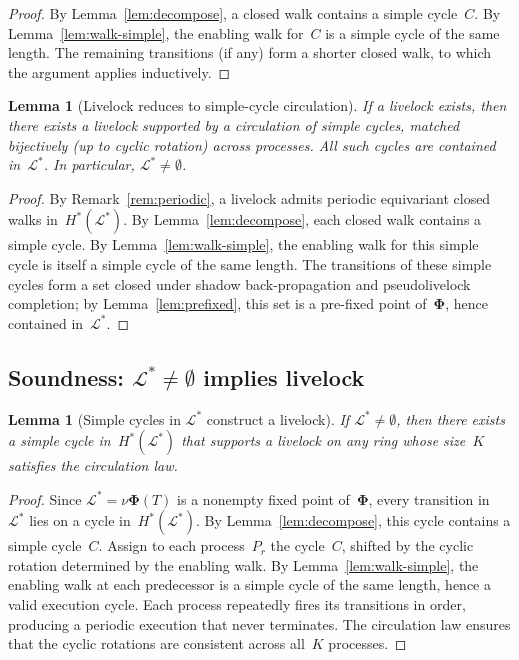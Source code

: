 \documentclass{article}
\newtheorem{lemma}[theorem]{Lemma}
\newcommand{\Ls}{\mathcal{L}^{*}}
\newcommand{\bPhi}{\boldsymbol{\Phi}}
\newcommand{\Hstar}{H^{*}}
\begin{document}
\begin{proof}
By Lemma~\ref{lem:decompose}, a closed walk contains a
simple cycle~$C$.
By Lemma~\ref{lem:walk-simple}, the enabling walk for~$C$
is a simple cycle of the same length.
The remaining transitions (if any) form a shorter closed walk,
to which the argument applies inductively.
\end{proof}

\begin{lemma}[Livelock reduces to simple-cycle circulation]
\label{lem:reduction}
If a livelock exists, then there exists a livelock supported
by a circulation of simple cycles, matched bijectively
(up to cyclic rotation) across processes.
All such cycles are contained in~$\Ls$.
In particular, $\Ls \neq \emptyset$.
\end{lemma}

\begin{proof}
By Remark~\ref{rem:periodic}, a livelock admits periodic
equivariant closed walks in~$\Hstar(\Ls)$.
By Lemma~\ref{lem:decompose}, each closed walk contains
a simple cycle.
By Lemma~\ref{lem:walk-simple}, the enabling walk for
this simple cycle is itself a simple cycle of the same length.
The transitions of these simple cycles form a set closed under
shadow back-propagation and pseudolivelock completion;
by Lemma~\ref{lem:prefixed}, this set is a pre-fixed point
of~$\bPhi$, hence contained in~$\Ls$.
\end{proof}

\subsection{Soundness:
\texorpdfstring{$\Ls \neq \emptyset$}{L* nonempty}
implies livelock}

\begin{lemma}[Simple cycles in $\Ls$ construct a livelock]
\label{lem:construction}
If $\Ls \neq \emptyset$, then there exists a simple cycle
in~$\Hstar(\Ls)$ that supports a livelock on any ring
whose size~$K$ satisfies the circulation law.
\end{lemma}

\begin{proof}
Since $\Ls = \nu\bPhi(T)$ is a nonempty fixed point of~$\bPhi$,
every transition in~$\Ls$ lies on a cycle
in~$\Hstar(\Ls)$.
By Lemma~\ref{lem:decompose}, this cycle contains a simple
cycle~$C$.
Assign to each process~$P_r$ the cycle~$C$, shifted by the
cyclic rotation determined by the enabling walk.
By Lemma~\ref{lem:walk-simple}, the enabling walk at each
predecessor is a simple cycle of the same length, hence
a valid execution cycle.
Each process repeatedly fires its transitions in order,
producing a periodic execution that never terminates.
The circulation law ensures that the cyclic rotations are
consistent across all~$K$ processes.
\end{proof}
\end{document}
